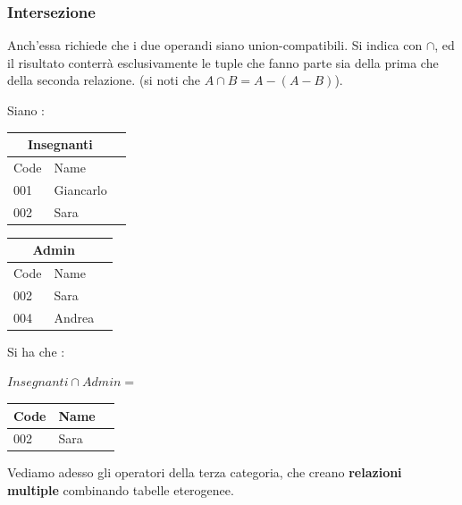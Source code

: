 \documentclass[12pt, letterpaper]{article}
\begin{document}
\subsubsection{Intersezione}
Anch'essa richiede che i due operandi siano union-compatibili. Si indica con \(\cap\), ed il
risultato conterrà esclusivamente le tuple che fanno parte sia della prima che della seconda relazione.
(si noti che \(A\cap B = A - (A-B)\)).
\begin{center}
    Siano : 
    \begin{tabular}{|l|l|r|}
        \hline
    \multicolumn{2}{|c|}{\textbf{Insegnanti}}\\
        \hline
        Code & Name  \\
        \hline
        001 & Giancarlo  \\
        \hline
        002 & Sara  \\
        \hline
        \end{tabular}
        \begin{tabular}{|l|l|r|}
            \hline
        \multicolumn{2}{|c|}{\textbf{Admin}}\\
            \hline
            Code & Name  \\
            \hline
            002 & Sara  \\
            \hline
            004 & Andrea  \\
            \hline
            \end{tabular}
 Si ha che :\end{center}\begin{center}
    \(Insegnanti\cap Admin =\)
    \begin{tabular}{|l|l|r|}
        \hline
        Code & Name  \\
        \hline
        002 & Sara  \\
        \hline
        \end{tabular}
 \end{center}
 Vediamo adesso gli operatori della terza categoria, che creano \textbf{relazioni multiple}
 combinando tabelle eterogenee.
\end{document}
